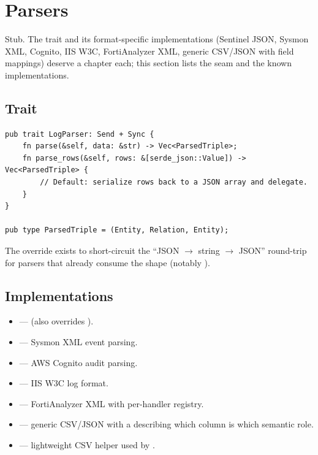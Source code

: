 \chapter{Parsers}
\label{ch:parsers}

\begin{note}
Stub. The  trait and its format-specific
implementations (Sentinel JSON, Sysmon XML, Cognito, IIS W3C,
FortiAnalyzer XML, generic CSV/JSON with field mappings) deserve a
chapter each; this section lists the seam and the known
implementations.
\end{note}

\section{Trait}

\begin{lstlisting}[style=rust]
pub trait LogParser: Send + Sync {
    fn parse(&self, data: &str) -> Vec<ParsedTriple>;
    fn parse_rows(&self, rows: &[serde_json::Value]) -> Vec<ParsedTriple> {
        // Default: serialize rows back to a JSON array and delegate.
    }
}

pub type ParsedTriple = (Entity, Relation, Entity);
\end{lstlisting}

The  override exists to short-circuit the
``JSON $\to$ string $\to$ JSON'' round-trip for parsers that
already consume the  shape (notably
).

\section{Implementations}

\begin{itemize}
    \item {} ---
         (also overrides ).
    \item {} --- Sysmon
        XML event parsing.
    \item {} --- AWS
        Cognito audit parsing.
    \item {} --- IIS
        W3C log format.
    \item {} ---
        FortiAnalyzer XML with per-handler registry.
    \item {} --- generic
        CSV/JSON with a  describing which column
        is which semantic role.
    \item {} ---
        lightweight CSV helper used by .
\end{itemize}


